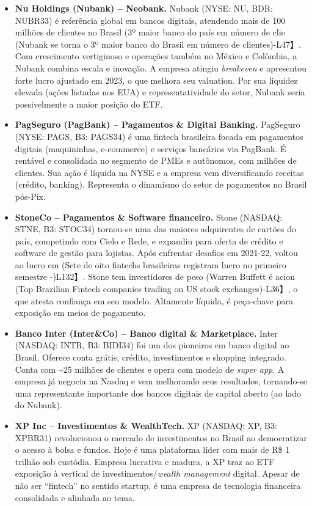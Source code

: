 \documentclass[12pt]{article}
\begin{document}
\begin{itemize}
\item \textbf{Nu Holdings (Nubank) – Neobank.} Nubank (NYSE: NU, BDR: NUBR33) é referência global em bancos digitais, atendendo mais de 100 milhões de clientes no Brasil (3º maior banco do país em número de clie (Nubank se torna o 3º maior banco do Brasil em número de clientes)-L47】. Com crescimento vertiginoso e operações também no México e Colômbia, a Nubank combina escala e inovação. A empresa atingiu \textit{breakeven} e apresentou forte lucro ajustado em 2023, o que melhora seu valuation. Por sua liquidez elevada (ações listadas nos EUA) e representatividade do setor, Nubank seria possivelmente a maior posição do ETF.

\item \textbf{PagSeguro (PagBank) – Pagamentos \& Digital Banking.} PagSeguro (NYSE: PAGS, B3: PAGS34) é uma fintech brasileira focada em pagamentos digitais (maquininhas, e-commerce) e serviços bancários via PagBank. É rentável e consolidada no segmento de PMEs e autônomos, com milhões de clientes. Sua ação é líquida na NYSE e a empresa vem diversificando receitas (crédito, banking). Representa o dinamismo do setor de pagamentos no Brasil pós-Pix.

\item \textbf{StoneCo – Pagamentos \& Software financeiro.} Stone (NASDAQ: STNE, B3: STOC34) tornou-se uma das maiores adquirentes de cartões do país, competindo com Cielo e Rede, e expandiu para oferta de crédito e software de gestão para lojistas. Após enfrentar desafios em 2021-22, voltou ao lucro em (Sete de oito fintechs brasileiras registram lucro no primeiro semestre -)L132】. Stone tem investidores de peso (Warren Buffett é acion (Top Brazilian Fintech companies trading on US stock exchanges)-L36】, o que atesta confiança em seu modelo. Altamente líquida, é peça-chave para exposição em meios de pagamento.

\item \textbf{Banco Inter (Inter\&Co) – Banco digital \& Marketplace.} Inter (NASDAQ: INTR, B3: BIDI34) foi um dos pioneiros em banco digital no Brasil. Oferece conta grátis, crédito, investimentos e shopping integrado. Conta com \textasciitilde25 milhões de clientes e opera com modelo de \textit{super app}. A empresa já negocia na Nasdaq e vem melhorando seus resultados, tornando-se uma representante importante dos bancos digitais de capital aberto (ao lado do Nubank).

\item \textbf{XP Inc – Investimentos \& WealthTech.} XP (NASDAQ: XP, B3: XPBR31) revolucionou o mercado de investimentos no Brasil ao democratizar o acesso à bolsa e fundos. Hoje é uma plataforma líder com mais de R\$ 1 trilhão sob custódia. Empresa lucrativa e madura, a XP traz ao ETF exposição à vertical de investimentos/\textit{wealth management} digital. Apesar de não ser “fintech” no sentido startup, é uma empresa de tecnologia financeira consolidada e alinhada ao tema.


\end{itemize}
\end{document}
